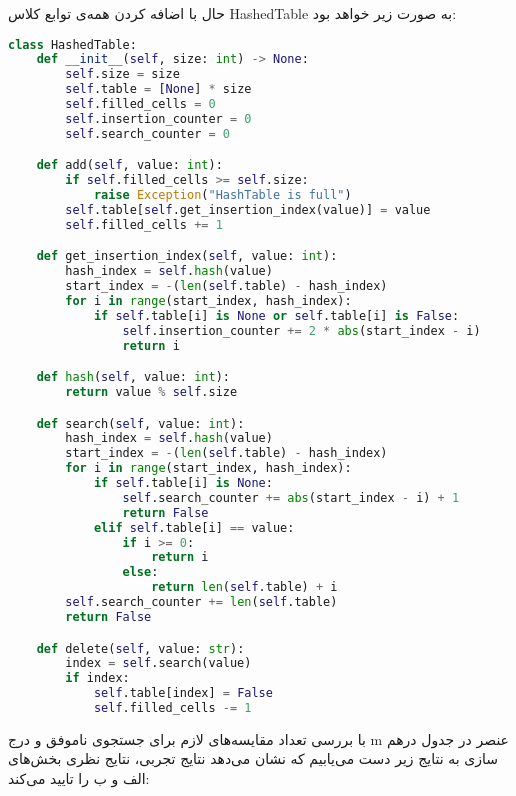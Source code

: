 \documentclass[]{article}
\begin{document}
حال با اضافه کردن همه‌ی توابع کلاس HashedTable به صورت زیر خواهد بود:
\begin{latin}
\begin{lstlisting}[language=Python, caption=HashedTable Implementation]
class HashedTable:
    def __init__(self, size: int) -> None:
        self.size = size
        self.table = [None] * size
        self.filled_cells = 0
        self.insertion_counter = 0
        self.search_counter = 0

    def add(self, value: int):
        if self.filled_cells >= self.size:
            raise Exception("HashTable is full")
        self.table[self.get_insertion_index(value)] = value
        self.filled_cells += 1

    def get_insertion_index(self, value: int):
        hash_index = self.hash(value)
        start_index = -(len(self.table) - hash_index)
        for i in range(start_index, hash_index):
            if self.table[i] is None or self.table[i] is False:
                self.insertion_counter += 2 * abs(start_index - i)
                return i

    def hash(self, value: int):
        return value % self.size

    def search(self, value: int):
        hash_index = self.hash(value)
        start_index = -(len(self.table) - hash_index)
        for i in range(start_index, hash_index):
            if self.table[i] is None:
                self.search_counter += abs(start_index - i) + 1
                return False
            elif self.table[i] == value:
                if i >= 0:
                    return i
                else:
                    return len(self.table) + i
        self.search_counter += len(self.table)
        return False

    def delete(self, value: str):
        index = self.search(value)
        if index:
            self.table[index] = False
            self.filled_cells -= 1
\end{lstlisting}
\end{latin}

با بررسی تعداد مقایسه‌های لازم برای جستجوی ناموفق و درج m عنصر در جدول درهم سازی به نتایج زیر دست می‌یابیم
که نشان می‌دهد نتایج تجربی، نتایج نظری بخش‌های الف و ب را تایید می‌کند:
\end{document}
